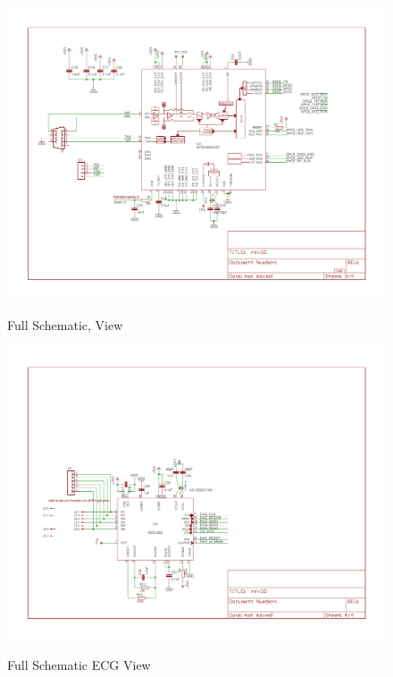 \begin{figure}
	\begin{center}
		\label{fig:FullSchematic_Sheet3}
		\includegraphics[angle=90,scale=1,width=1\textwidth]{Images/rev1D_sheet3.pdf} 
		\caption{Full Schematic,  View}
	\end{center}
\end{figure}

\begin{figure}
	\begin{center}
		\label{fig:FullSchematic_Sheet4}
		\includegraphics[angle=90,scale=1,width=1\textwidth]{Images/rev1D_sheet4.pdf} 
		\caption{Full Schematic ECG View}
	\end{center}
\end{figure}

